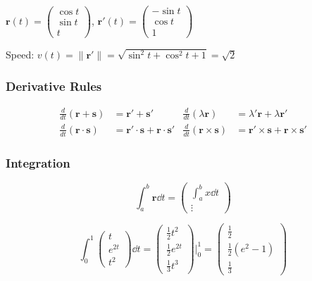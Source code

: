\begin{example}[Helix]
  $\mathbf{r}(t) =
    \begin{pmatrix}
      \cos t \\ \sin t \\ t
    \end{pmatrix}
  $, \quad
  $\mathbf{r}'(t) =
    \begin{pmatrix}
      -\sin t \\ \cos t \\ 1
    \end{pmatrix}
  $

  Speed: $v(t) = \lVert\mathbf{r}'\rVert = \sqrt{\sin^{2}t+\cos^{2}t+1} = \sqrt{2}$
\end{example}

\subsubsection{Derivative Rules}

\begin{align*}
  \frac{d}{dt}(\mathbf{r}+\mathbf{s})      & = \mathbf{r}'+\mathbf{s}'                                 &
  \frac{d}{dt}(\lambda\mathbf{r})          & = \lambda'\mathbf{r}+\lambda\mathbf{r}'                     \\[4pt]
  \frac{d}{dt}(\mathbf{r}\cdot\mathbf{s})  & = \mathbf{r}'\cdot\mathbf{s}+\mathbf{r}\cdot\mathbf{s}'   &
  \frac{d}{dt}(\mathbf{r}\times\mathbf{s}) & = \mathbf{r}'\times\mathbf{s}+\mathbf{r}\times\mathbf{s}'
\end{align*}

\subsubsection{Integration}

\[
  \int_{a}^{b}\mathbf{r}\dd{t}
  =
  \begin{pmatrix}
    \int_{a}^{b}x\dd{t} \\[4pt] \vdots
  \end{pmatrix}
\]

\begin{example}
  \[
    \int_{0}^{1}
    \begin{pmatrix}
      t \\ e^{2t} \\ t^{2}
    \end{pmatrix}
    \dd{t}
    =
    \begin{pmatrix}
      \frac{1}{2}t^{2} \\[4pt] \frac{1}{2}e^{2t} \\[4pt] \frac{1}{3}t^{3}
    \end{pmatrix}
    \Bigg|_{0}^{1}
    =
    \begin{pmatrix}
      \frac{1}{2} \\[4pt] \frac{1}{2}(e^{2}-1) \\[4pt] \frac{1}{3}
    \end{pmatrix}
  \]
\end{example}

